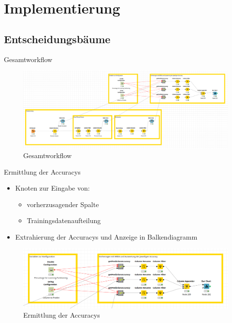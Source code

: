 \documentclass[
	handout,
  	aspectratio=169
]{beamer}
\begin{document}
	\section{Implementierung}	
	\frame{\sectionpage}
	
		\subsection{Entscheidungsbäume}
			\begin{frame}{Gesamtworkflow}
				\begin{center}					
					\begin{figure}[h]
						\includegraphics[scale=0.25]{../pictures/trees-workflow-gesamt.png}
						\caption{Gesamtworkflow}		
					\end{figure}	
				\end{center}	
			\end{frame}
			
			\begin{frame}{Ermittlung der Accuracys}
				\begin{itemize}
					\item Knoten zur Eingabe von:	
					\begin{itemize}
						\item vorherzusagender Spalte
						\item Trainingsdatenaufteilung
					\end{itemize}	
					\item Extrahierung der Accuracys und Anzeige in Balkendiagramm
				\end{itemize}
				\begin{center}					
					\begin{figure}[h]
						\includegraphics[scale=0.2]{../pictures/trees-workflow-gesamt-zoomed.png}
						\caption{Ermittlung der Accuracys}		
					\end{figure}	
				\end{center}	
			\end{frame}
			
\end{document}
